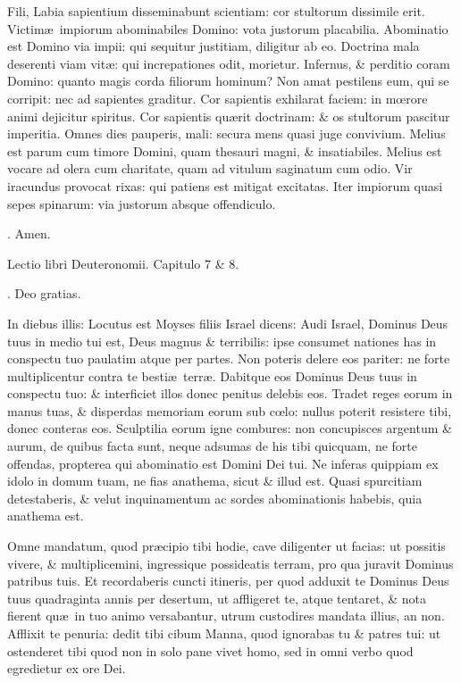 \documentclass[letter,11pt]{book}
\makeatletter
\DeclareRobustCommand{\Rbar}{\vers@resp{0pt}{R}}
\newcommand{\vers@resp@sym}{\raisebox{0.2ex}{\rotatebox[origin=c]{-20}{$\m@th\rceil$}}}
\newcommand{\vers@resp}[2]{%
  {\ooalign{\hidewidth\kern#1\vers@resp@sym\hidewidth\cr#2\cr}}%
}%
\def\R{\color{Red} \Rbar . \color{black}}
\makeatother
\begin{document}
\begin{multicols*}{2}
Fili, Labia sapientium disseminabunt scientiam: cor stultorum dissimile erit. Victim\ae \ impiorum abominabiles Domino: vota justorum placabilia. Abominatio est Domino via impii: qui sequitur justitiam, diligitur ab eo. Doctrina mala deserenti viam vit\ae : qui increpationes odit, morietur. Infernus, \& perditio coram Domino: quanto magis corda filiorum hominum? Non amat pestilens eum, qui se corripit: nec ad sapientes graditur. Cor sapientis exhilarat faciem: in m\oe rore animi dejicitur spiritus. Cor sapientis qu\ae rit doctrinam: \& os stultorum pascitur imperitia. Omnes dies pauperis, mali: secura mens quasi juge convivium. Melius est parum cum timore Domini, quam thesauri magni, \& insatiabiles. Melius est vocare ad olera cum charitate, quam ad vitulum saginatum cum odio. Vir iracundus provocat rixas: qui patiens est mitigat excitatas. Iter impiorum quasi sepes spinarum: via justorum absque offendiculo.

\R Amen.

Lectio libri Deuteronomii. Capitulo 7 \& 8.

\R Deo gratias.

In diebus illis: Locutus est Moyses filiis Israel dicens: Audi Israel, Dominus Deus tuus in medio tui est, Deus magnus \& terribilis: ipse consumet nationes has in conspectu tuo paulatim atque per partes. Non poteris delere eos pariter: ne forte multiplicentur contra te besti\ae \ terr\ae . Dabitque eos Dominus Deus tuus in conspectu tuo: \& interficiet illos donec penitus delebis eos. Tradet reges eorum in manus tuas, \& disperdas memoriam eorum sub c\oe lo: nullus poterit resistere tibi, donec conteras eos. Sculptilia eorum igne combures: non concupisces argentum \& aurum, de quibus facta sunt, neque adsumas de his tibi quicquam, ne forte offendas, propterea qui abominatio est Domini Dei tui. Ne inferas quippiam ex idolo in domum tuam, ne fias anathema, sicut \& illud est. Quasi spurcitiam detestaberis, \& velut inquinamentum ac sordes abominationis habebis, quia anathema est.

Omne mandatum, quod pr\ae cipio tibi hodie, cave diligenter ut facias: ut possitis vivere, \& multiplicemini, ingressique possideatis terram, pro qua juravit Dominus patribus tuis. Et recordaberis cuncti itineris, per quod adduxit te Dominus Deus tuus quadraginta annis per desertum, ut affligeret te, atque tentaret, \& nota fierent qu\ae \ in tuo animo versabantur, utrum custodires mandata illius, an non. Afflixit te penuria: dedit tibi cibum Manna, quod ignorabas tu \& patres tui: ut ostenderet tibi quod non in solo pane vivet homo, sed in omni verbo quod egredietur ex ore Dei.


\end{multicols*}
\end{document}
